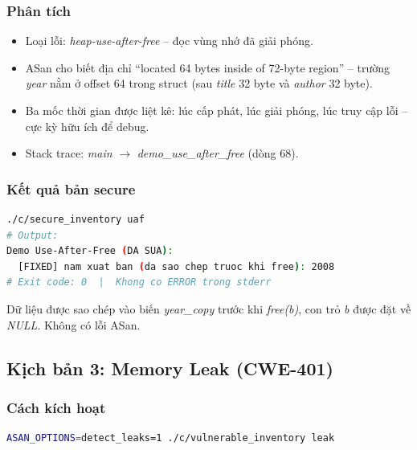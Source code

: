 \subsubsection{Phân tích}

\begin{itemize}
    \item Loại lỗi: \textit{heap-use-after-free} -- đọc vùng nhớ đã giải phóng.
    \item ASan cho biết địa chỉ ``located 64 bytes inside of 72-byte region'' --
          trường \textit{year} nằm ở offset 64 trong struct (sau \textit{title}
          32 byte và \textit{author} 32 byte).
    \item Ba mốc thời gian được liệt kê: lúc cấp phát, lúc giải phóng, lúc truy
          cập lỗi -- cực kỳ hữu ích để debug.
    \item Stack trace: \textit{main} $\to$ \textit{demo\_use\_after\_free}
          (dòng 68).
\end{itemize}

\subsubsection{Kết quả bản secure}

\begin{lstlisting}[language=bash, caption={Bản secure -- UAF clean}]
./c/secure_inventory uaf
# Output:
Demo Use-After-Free (DA SUA):
  [FIXED] nam xuat ban (da sao chep truoc khi free): 2008
# Exit code: 0  |  Khong co ERROR trong stderr
\end{lstlisting}

Dữ liệu được sao chép vào biến \textit{year\_copy} trước khi \textit{free(b)},
con trỏ \textit{b} được đặt về \textit{NULL}. Không có lỗi ASan.

\subsection{Kịch bản 3: Memory Leak (CWE-401)}

\subsubsection{Cách kích hoạt}

\begin{lstlisting}[language=bash, caption={Kích hoạt memory leak với LeakSanitizer}]
ASAN_OPTIONS=detect_leaks=1 ./c/vulnerable_inventory leak
\end{lstlisting}

